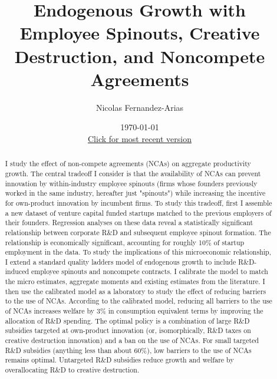 \documentclass[11pt,english]{article}
\begin{document}
	
\title{Endogenous Growth with Employee Spinouts, Creative Destruction, and Noncompete Agreements}

\author{Nicolas Fernandez-Arias} 
\date{\today \\ \small
	\href{https://drive.google.com/file/d/17bZL7-AUJKllRb78r9fIkZscnNdJwo1G/view?usp=sharing}{Click for most recent version}}


\maketitle



\begin{abstract}
	I study the effect of non-compete agreements (NCAs) on aggregate productivity growth. The central tradeoff I consider is that the availability of NCAs can prevent innovation by within-industry employee spinouts (firms whose founders previously worked in the same industry, hereafter just "spinouts") while increasing the incentive for own-product innovation by incumbent firms. To study this tradeoff, first I assemble a new dataset of venture capital funded startups matched to the previous employers of their founders. Regression analyses on these data reveal a statistically significant relationship between corporate R\&D and subsequent employee spinout formation. The relationship is economically significant, accounting for roughly 10\% of startup employment in the data. To study the implications of this microeconomic relationship, I extend a standard quality ladders model of endogenous growth to include R\&D-induced employee spinouts and noncompete contracts. I calibrate the model to match the micro estimates, aggregate moments and existing estimates from the literature. I then use the calibrated model as a laboratory to study the effect of reducing barriers to the use of NCAs. According to the calibrated model, reducing all barriers to the use of NCAs increases welfare by 3\% in consumption equivalent terms by improving the allocation of R\&D spending. The optimal policy is a combination of large R\&D subsidies targeted at own-product innovation (or, isomorphically, R\&D taxes on creative destruction innovation) and a ban on the use of NCAs. For small targeted R\&D subsidies (anything less than about 60\%), low barriers to the use of NCAs remains optimal. Untargeted R\&D subsidies reduce growth and welfare by overallocating R\&D to creative destruction. 
\end{abstract}
\end{document}
